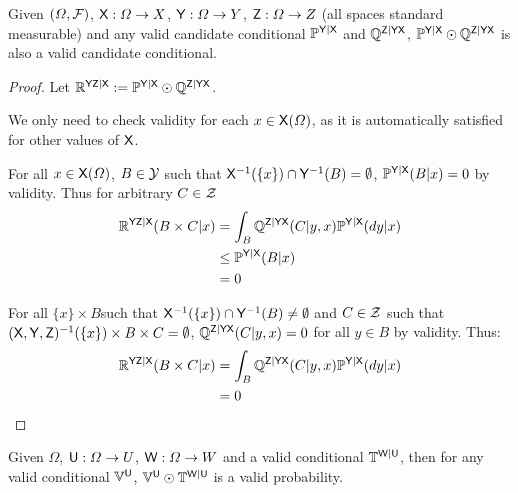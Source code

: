 \begin{theorem}\label{lem:valid_extendability}
Given $(\Omega,\mathcal{F})$, $\mathsf{X}:\Omega\to X$, $\mathsf{Y}:\Omega\to Y$, $\mathsf{Z}:\Omega\to Z$ (all spaces standard measurable) and any valid candidate conditional $\mathbb{P}^{\mathsf{Y}|\mathsf{X}}$ and $\mathbb{Q}^{\mathsf{Z}|\mathsf{Y}\mathsf{X}}$, $ \mathbb{P}^{\mathsf{Y}|\mathsf{X}}\odot \mathbb{Q}^{\mathsf{Z}|\mathsf{Y}\mathsf{X}}$ is also a valid candidate conditional.
\end{theorem}

\begin{proof}
Let $\mathbb{R}^{\mathsf{YZ}|\mathsf{X}}:=\mathbb{P}^{\mathsf{Y}|\mathsf{X}}\odot \mathbb{Q}^{\mathsf{Z}|\mathsf{Y}\mathsf{X}}$.

We only need to check validity for each $x\in \mathsf{X}(\Omega)$, as it is automatically satisfied for other values of $\mathsf{X}$.

For all $x\in \mathsf{X}(\Omega)$, $B\in \mathcal{Y}$ such that $\mathsf{X}^{-1}( \{x\})\cap\mathsf{Y}^{-1}( B)=\emptyset$, $\mathbb{P}^{\mathsf{Y}|\mathsf{X}}(B|x)=0$ by validity. Thus for arbitrary $C\in \mathcal{Z}$
\begin{align}
    \mathbb{R}^{\mathsf{YZ}|\mathsf{X}}(B\times C|x) &= \int_B \mathbb{Q}^{\mathsf{Z}|\mathsf{YX}}(C|y,x)\mathbb{P}^{\mathsf{Y}|\mathsf{X}}(dy|x)\\
                                  &\leq \mathbb{P}^{\mathsf{Y}|\mathsf{X}}(B|x)\\
                                  &=0
\end{align}

For all $\{x\}\times B$such that $\mathsf{X}^{-1}( \{x\})\cap\mathsf{Y}^{-1}( B)\neq \emptyset$ and $C\in \mathcal{Z}$ such that $(\mathsf{X},\mathsf{Y},\mathsf{Z})^{-1} (\{x\})\times B\times C=\emptyset$, $\mathbb{Q}^{\mathsf{Z}|\mathsf{YX}}(C|y,x)=0$ for all $y\in B$ by validity. Thus:
\begin{align}
    \mathbb{R}^{\mathsf{YZ}|\mathsf{X}}(B\times C|x) &= \int_B \mathbb{Q}^{\mathsf{Z}|\mathsf{YX}}(C|y,x)\mathbb{P}^{\mathsf{Y}|\mathsf{X}}(dy|x)\\
                                            &=0
\end{align}
\end{proof}

\begin{corollary}\label{corr:valid_extend_order1}
Given $\Omega$, $\mathsf{U}:\Omega\to U$, $\mathsf{W}:\Omega\to W$ and a valid conditional $\mathbb{T}^{\mathsf{W}|\mathsf{U}}$, then for any valid conditional $\mathbb{V}^{\mathsf{U}}$, $\mathbb{V}^{\mathsf{U}}\odot \mathbb{T}^{\mathsf{W}|\mathsf{U}}$ is a valid probability.
\end{corollary}

